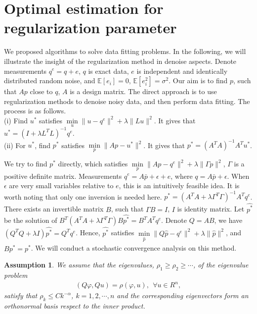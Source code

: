 \documentclass[11pt]{article}
\newtheorem{assumption}{Assumption}
\numberwithin{equation}{section}
\begin{document}
\section{Optimal estimation for regularization parameter}\label{section5}
We proposed algorithms to solve data fitting problems.
In the following, we will illustrate the insight of the regularization method in denoise aspects. Denote measurements $q^e=q+e$, $q$ is exact data, $e$ is independent and identically distributed random noise, and $\mathbb{E}[e_i]=0$, $\mathbb{E}[e_i^2]=\sigma^2$. Our aim is to find $p$, such that $Ap$ close to $q$, $A$ is a design matrix. The direct approach is to use regularization methods to denoise noisy data, and then perform data fitting. The process is as follows.\\
(i) Find $u^*$ satisfies $\min\limits_{u} \|u-q^e\|^2 + \lambda\|Lu\|^2$. It gives that $u^*=(I+\lambda L^TL)^{-1}q^e$.\\
(ii) For $u^*$, find $p^*$ satisfies $\min\limits_{p} \|Ap-u^*\|^2$. It gives that $p^*=(A^TA)^{-1}A^{T}u^*$.

We try to find $p^*$ directly, which satisfies $\min\limits_{p} \|Ap-q^e\|^2 + \lambda\|\Gamma p\|^2$, $\Gamma$ is a positive definite matrix. 
Measurements $q^e=A\bar{p}+\epsilon+e$, where $q=A\bar{p}+\epsilon$. When $\epsilon$ are very small variables relative to $e$, this is an intuitively feasible idea. It is worth noting that only one inversion is needed here. $p^*=(A^TA+\lambda \Gamma^T\Gamma)^{-1}A^Tq^e$. There exists an invertible matrix $B$, such that $\Gamma B=I$, $I$ is identity matrix. Let $\hat{p^*}$ be the solution of $B^T(A^TA+\lambda\Gamma^T\Gamma)B\hat{p^*}=B^TA^Tq^e$. Denote $Q=AB$, we have
$(Q^TQ+\lambda I)\hat{p^*}=Q^Tq^e$. Hence, $\hat{p^*}$ satisfies $\min\limits_{\hat{p}} \|Q\hat{p}-q^e\|^2 + \lambda\|\hat{p}\|^2$, and $B\hat{p^*}=p^*$. We will conduct a stochastic convergence analysis on this method.

\begin{assumption}\label{ass-1} We assume that the eigenvalues, $\rho_1\geq\rho_2\geq\cdots$, of the eigenvalue problem
\begin{align*}
(Q\varphi,Qu)=\rho(\varphi,u),~~\forall u\in R^n,    
\end{align*}
satisfy that $\rho_k\leq Ck^{-\alpha}$, $k=1,2,\cdots,n$ and the corresponding eigenvectors form an orthonormal basis respect to the inner product.
\end{assumption}
\end{document}

